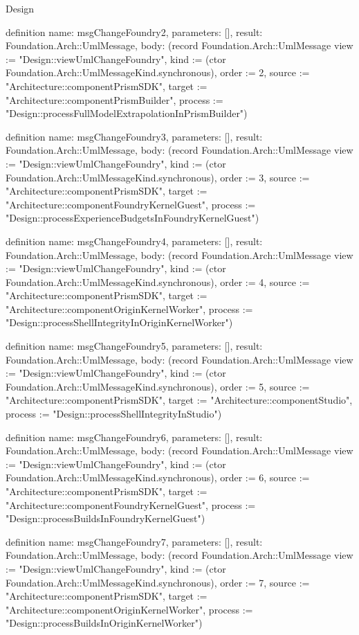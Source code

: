 \begin{lexlean}{Design}
\begin{semanticmodule}
definition{
  name: msgChangeFoundry2,
  parameters: [],
  result: Foundation.Arch::UmlMessage,
  body: (record Foundation.Arch::UmlMessage {view := "Design::viewUmlChangeFoundry", kind := (ctor Foundation.Arch::UmlMessageKind.synchronous), order := 2, source := "Architecture::componentPrismSDK", target := "Architecture::componentPrismBuilder", process := "Design::processFullModelExtrapolationInPrismBuilder"})
}

definition{
  name: msgChangeFoundry3,
  parameters: [],
  result: Foundation.Arch::UmlMessage,
  body: (record Foundation.Arch::UmlMessage {view := "Design::viewUmlChangeFoundry", kind := (ctor Foundation.Arch::UmlMessageKind.synchronous), order := 3, source := "Architecture::componentPrismSDK", target := "Architecture::componentFoundryKernelGuest", process := "Design::processExperienceBudgetsInFoundryKernelGuest"})
}

definition{
  name: msgChangeFoundry4,
  parameters: [],
  result: Foundation.Arch::UmlMessage,
  body: (record Foundation.Arch::UmlMessage {view := "Design::viewUmlChangeFoundry", kind := (ctor Foundation.Arch::UmlMessageKind.synchronous), order := 4, source := "Architecture::componentPrismSDK", target := "Architecture::componentOriginKernelWorker", process := "Design::processShellIntegrityInOriginKernelWorker"})
}

definition{
  name: msgChangeFoundry5,
  parameters: [],
  result: Foundation.Arch::UmlMessage,
  body: (record Foundation.Arch::UmlMessage {view := "Design::viewUmlChangeFoundry", kind := (ctor Foundation.Arch::UmlMessageKind.synchronous), order := 5, source := "Architecture::componentPrismSDK", target := "Architecture::componentStudio", process := "Design::processShellIntegrityInStudio"})
}

definition{
  name: msgChangeFoundry6,
  parameters: [],
  result: Foundation.Arch::UmlMessage,
  body: (record Foundation.Arch::UmlMessage {view := "Design::viewUmlChangeFoundry", kind := (ctor Foundation.Arch::UmlMessageKind.synchronous), order := 6, source := "Architecture::componentPrismSDK", target := "Architecture::componentFoundryKernelGuest", process := "Design::processBuildsInFoundryKernelGuest"})
}

definition{
  name: msgChangeFoundry7,
  parameters: [],
  result: Foundation.Arch::UmlMessage,
  body: (record Foundation.Arch::UmlMessage {view := "Design::viewUmlChangeFoundry", kind := (ctor Foundation.Arch::UmlMessageKind.synchronous), order := 7, source := "Architecture::componentPrismSDK", target := "Architecture::componentOriginKernelWorker", process := "Design::processBuildsInOriginKernelWorker"})
}


\end{semanticmodule}
\end{lexlean}
